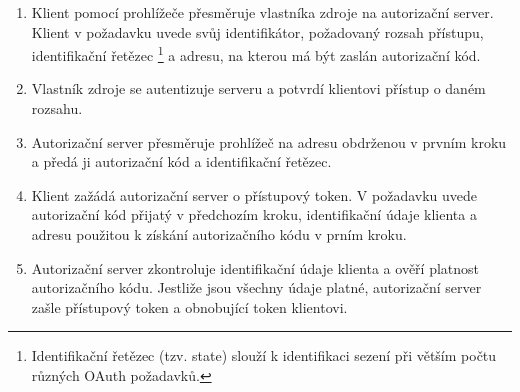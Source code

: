 \documentclass[]{fithesis3}
\begin{document}
	\begin{enumerate}
		\item {
		Klient pomocí prohlížeče přesměruje vlastníka zdroje na autorizační server. Klient v 				požadavku uvede svůj identifikátor, požadovaný rozsah přístupu,  identifikační řetězec
			\footnote {
			Identifikační řetězec (tzv. state) slouží k identifikaci sezení při větším počtu různých 				OAuth požadavků.
			}	 
		a adresu, na kterou má být zaslán autorizační kód.
		}
		\item
		Vlastník zdroje se autentizuje serveru a potvrdí klientovi přístup o daném rozsahu.
		\item
		Autorizační server přesměruje prohlížeč na adresu obdrženou v prvním kroku a předá ji 			autorizační kód a identifikační řetězec.
		\item
		Klient zažádá autorizační server o přístupový token. V požadavku uvede autorizační kód 			přijatý v předchozím kroku, identifikační údaje klienta a adresu použitou k získání 					autorizačního kódu v prním kroku. 
		\item	
		Autorizační server zkontroluje identifikační údaje klienta a ověří platnost autorizačního 				kódu. Jestliže jsou všechny údaje platné, autorizační server zašle přístupový token a 				obnobující token klientovi.

	\end{enumerate}
\end{document}
